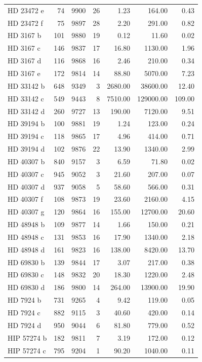 \begin{table}
\begin{tabular}{lrrrrrr}
HD 23472 e & 74 & 9900 & 26 & 1.23 & 164.00 & 0.43 \\
HD 23472 f & 75 & 9897 & 28 & 2.20 & 291.00 & 0.82 \\
HD 3167 b & 101 & 9880 & 19 & 0.12 & 11.60 & 0.02 \\
HD 3167 c & 146 & 9837 & 17 & 16.80 & 1130.00 & 1.96 \\
HD 3167 d & 116 & 9868 & 16 & 2.46 & 210.00 & 0.34 \\
HD 3167 e & 172 & 9814 & 14 & 88.80 & 5070.00 & 7.23 \\
HD 33142 b & 648 & 9349 & 3 & 2680.00 & 38600.00 & 12.40 \\
HD 33142 c & 549 & 9443 & 8 & 7510.00 & 129000.00 & 109.00 \\
HD 33142 d & 260 & 9727 & 13 & 190.00 & 7120.00 & 9.51 \\
HD 39194 b & 100 & 9881 & 19 & 1.24 & 123.00 & 0.24 \\
HD 39194 c & 118 & 9865 & 17 & 4.96 & 414.00 & 0.71 \\
HD 39194 d & 102 & 9876 & 22 & 13.90 & 1340.00 & 2.99 \\
HD 40307 b & 840 & 9157 & 3 & 6.59 & 71.80 & 0.02 \\
HD 40307 c & 945 & 9052 & 3 & 21.60 & 207.00 & 0.07 \\
HD 40307 d & 937 & 9058 & 5 & 58.60 & 566.00 & 0.31 \\
HD 40307 f & 108 & 9873 & 19 & 23.60 & 2160.00 & 4.15 \\
HD 40307 g & 120 & 9864 & 16 & 155.00 & 12700.00 & 20.60 \\
HD 48948 b & 109 & 9877 & 14 & 1.66 & 150.00 & 0.21 \\
HD 48948 c & 131 & 9853 & 16 & 17.90 & 1340.00 & 2.18 \\
HD 48948 d & 161 & 9823 & 16 & 138.00 & 8420.00 & 13.70 \\
HD 69830 b & 139 & 9844 & 17 & 3.07 & 217.00 & 0.38 \\
HD 69830 c & 148 & 9832 & 20 & 18.30 & 1220.00 & 2.48 \\
HD 69830 d & 186 & 9800 & 14 & 264.00 & 13900.00 & 19.90 \\
HD 7924 b & 731 & 9265 & 4 & 9.42 & 119.00 & 0.05 \\
HD 7924 c & 882 & 9115 & 3 & 40.60 & 420.00 & 0.14 \\
HD 7924 d & 950 & 9044 & 6 & 81.80 & 779.00 & 0.52 \\
HIP 57274 b & 182 & 9811 & 7 & 3.19 & 172.00 & 0.12 \\
HIP 57274 c & 795 & 9204 & 1 & 90.20 & 1040.00 & 0.11 \\

\end{tabular}
\end{table}
